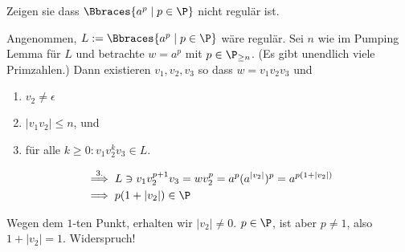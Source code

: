 
\begin{exercise}

Zeigen sie dass $\Bbraces{a^p \mid p \in \P}$ nicht regulär ist.

\end{exercise}


\begin{solution}

Angenommen, $L := \Bbraces{a^p \mid p \in \P}$ wäre regulär.
Sei $n$ wie im Pumping Lemma für $L$ und betrachte $w = a^p$ mit $p \in \P_{\geq n}$.
(Es gibt unendlich viele Primzahlen.)
Dann existieren $v_1, v_2, v_3$ so dass $w = v_1 v_2 v_3$ und

\begin{enumerate}
    \item $v_2 \neq \epsilon$
    \item $|v_1 v_2| \leq n$, und
    \item für alle $k \geq 0: v_1 v_2^k v_3 \in L$.
\end{enumerate}

\begin{align*}
    & \stackrel{3.}{\implies}
    L \ni v_1 v_2^{p+1} v_3 = w v_2^p = a^p (a^{|v_2|})^p = a^{p (1 + |v_2|)} \\
    & \implies
    p (1 + |v_2|) \in \P
\end{align*}

Wegen dem $1$-ten Punkt, erhalten wir $|v_2| \neq 0$.
$p \in \P$, ist aber $p \neq 1$, also $1 + |v_2| = 1$.
Widerspruch!

\end{solution}

